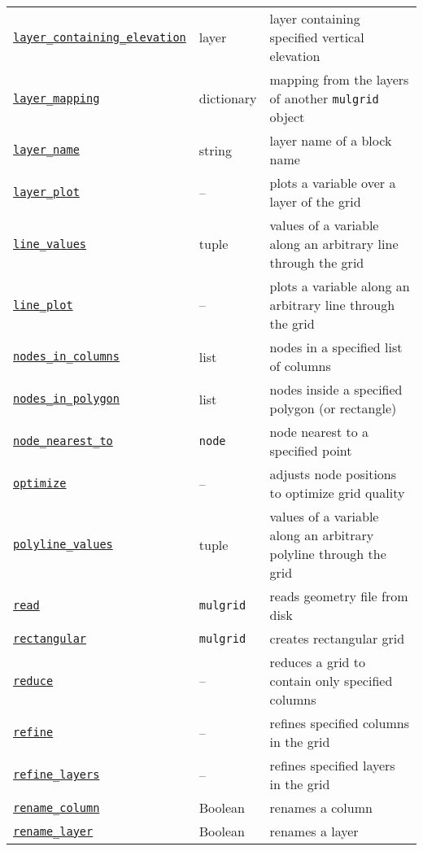 \begin{center}
\begin{longtable}{|l|l|p{70mm}|}
  \hyperref[sec:layer_containing_elevation]{\texttt{layer\_containing\_elevation}} & layer & layer containing specified vertical elevation\\
  \hyperref[sec:layer_mapping]{\texttt{layer\_mapping}} & dictionary & mapping from the layers of another \texttt{mulgrid} object\\
  \hyperref[sec:layer_name]{\texttt{layer\_name}} & string & layer name of a block name\\ 
  \hyperref[sec:layer_plot]{\texttt{layer\_plot}} & -- & plots a variable over a layer of the grid\\
  \hyperref[sec:line_values]{\texttt{line\_values}} & tuple & values of a variable along an arbitrary line through the grid\\
  \hyperref[sec:line_plot]{\texttt{line\_plot}} & -- & plots a variable along an arbitrary line through the grid\\
  \hyperref[sec:nodes_in_columns]{\texttt{nodes\_in\_columns}} & list & nodes in a specified list of columns\\ 
  \hyperref[sec:nodes_in_polygon]{\texttt{nodes\_in\_polygon}} & list & nodes inside a specified polygon (or rectangle)\\ 
  \hyperref[sec:node_nearest_to]{\texttt{node\_nearest\_to}} & \texttt{node} & node nearest to a specified point\\ 
  \hyperref[sec:optimize]{\texttt{optimize}} & -- & adjusts node positions to optimize grid quality\\
  \hyperref[sec:polyline_values]{\texttt{polyline\_values}} & tuple & values of a variable along an arbitrary polyline through the grid\\
  \hyperref[sec:read]{\texttt{read}} & \texttt{mulgrid} & reads geometry file from disk\\
  \hyperref[sec:rectangular]{\texttt{rectangular}} & \texttt{mulgrid} & creates rectangular grid\\
  \hyperref[sec:reduce]{\texttt{reduce}} & -- & reduces a grid to contain only specified columns\\
  \hyperref[sec:refine]{\texttt{refine}} & -- & refines specified columns in the grid\\
  \hyperref[sec:refine_layers]{\texttt{refine\_layers}} & -- & refines specified layers in the grid\\
  \hyperref[sec:rename_column]{\texttt{rename\_column}} & Boolean & renames a column\\
  \hyperref[sec:rename_layer]{\texttt{rename\_layer}} & Boolean & renames a layer\\

\end{longtable}
\end{center}
